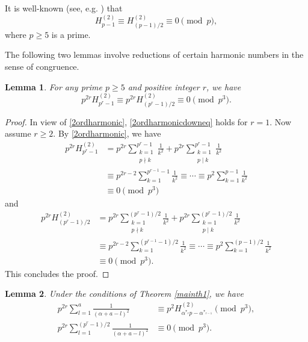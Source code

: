\documentclass[12pt,reqno]{amsart}
\def\f{\frac}
\def\eq{\equiv}
\theoremstyle{plain}
\newtheorem{lemma}{Lemma}[section]
\theoremstyle{definition}
\theoremstyle{remark}
\numberwithin{equation}{section}
\begin{document}
It is well-known (see, e.g. \cite{W}) that
\begin{equation}\label{2ordharmonic}
H_{p-1}^{(2)}\eq H_{(p-1)/2}^{(2)}\eq 0\pmod{p},
\end{equation}
where $p\geq 5$ is a prime.

The following two lemmas involve reductions of certain harmonic numbers in the sense of congruence.

\begin{lemma}\label{2ordharmonicdown}
For any prime $p\geq 5$ and positive integer $r$, we have
\begin{equation}\label{2ordharmonicdowneq}
p^{2r}H_{p^r-1}^{(2)}\eq p^{2r}H_{(p^r-1)/2}^{(2)}\eq 0\pmod{p^3}.
\end{equation}
\end{lemma}

\begin{proof}
In view of \eqref{2ordharmonic}, \eqref{2ordharmonicdowneq} holds for $r=1$. Now assume $r\geq 2$. By \eqref{2ordharmonic}, we have
\begin{align*}
p^{2r}H_{p^r-1}^{(2)}&=p^{2r}\sum_{\substack{k=1\\ p\nmid k}}^{p^r-1}\f{1}{k^2}+p^{2r}\sum_{\substack{k=1\\ p\mid k}}^{p^r-1}\f{1}{k^2}\\
&\eq  p^{2r-2}\sum_{k=1}^{p^{r-1}-1}\f{1}{k^2}\eq \cdots\eq p^2\sum_{k=1}^{p-1}\f{1}{k^2}\\
&\eq 0\pmod{p^3}
\end{align*}
and
\begin{align*}
p^{2r}H_{(p^r-1)/2}^{(2)}&=p^{2r}\sum_{\substack{k=1\\ p\nmid k}}^{(p^r-1)/2}\f{1}{k^2}+p^{2r}\sum_{\substack{k=1\\ p\mid k}}^{(p^r-1)/2}\f{1}{k^2}\\
&\eq  p^{2r-2}\sum_{k=1}^{(p^{r-1}-1)/2}\f{1}{k^2}\eq \cdots\eq p^2\sum_{k=1}^{(p-1)/2}\f{1}{k^2}\\
&\eq 0\pmod{p^3}.
\end{align*}
This concludes the proof.
\end{proof}

\begin{lemma}\label{harmonicreduce}
Under the conditions of Theorem \ref{mainth1}, we have
\begin{align}
\label{harmonicreduce1eq}p^{2r}\sum_{l=1}^{a}\f{1}{(\alpha+a-l)^2}&\eq p^2H_{\alpha^{\ast_r}p-\alpha^{\ast_{r-1}}}^{(2)}\pmod{p^3},\\
\label{harmonicreduce2eq}p^{2r}\sum_{l=1}^{(p^r-1)/2}\f{1}{(\alpha+a-l)^2}&\eq 0\pmod{p^3}.
\end{align}
\end{lemma}
\end{document}
